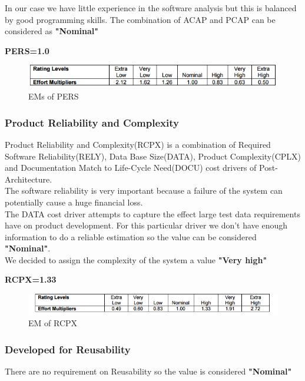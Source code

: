 			In our case we have little experience in the software analysis but this is balanced by good programming skills. The combination of ACAP and PCAP can be considered as \textbf{"Nominal"}
			
			\textbf{PERS=1.0}
\begin{figure}[H] 
	\centering
	\includegraphics[scale = 0.6]{img/PERS.png}
	\caption{EMs of PERS}
\end{figure}
		

			
\subsubsection{Product Reliability and Complexity}
	Product Reliability and Complexity(RCPX) is a combination of Required Software Reliability(RELY), Data Base Size(DATA), Product Complexity(CPLX) and Documentation Match to Life-Cycle Need(DOCU) cost drivers of Post-Architecture. 
			\\
			The software reliability is very important because a failure of the system can potentially cause a huge financial loss.\\
			The DATA cost driver attempts to capture the effect large test data requirements have on product development. For this particular driver we don’t have enough information to do a reliable estimation so the value can be considered \textbf{"Nominal"}.\\
			We decided to assign the complexity of the system a value \textbf{"Very high"}
			
		
			\textbf{RCPX=1.33}

\begin{figure}[H] 
	\centering
	\includegraphics[scale = 0.6]{img/RCPX.png}
	\caption{EM of RCPX}
\end{figure}
	
		
\subsubsection{Developed for Reusability}		
			There are no requirement on Reusability so the value is considered \textbf{"Nominal"}
			
